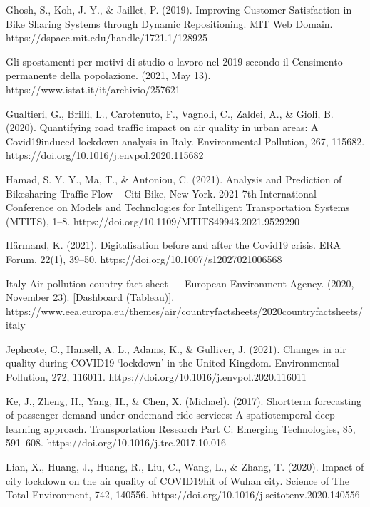 \documentclass[letterpaper,10pt,english]{jupyterBook}
\begin{document}
\sphinxAtStartPar
Ghosh, S., Koh, J. Y., \& Jaillet, P. (2019). Improving Customer Satisfaction in Bike Sharing Systems through Dynamic Repositioning. MIT Web Domain. https://dspace.mit.edu/handle/1721.1/128925

\sphinxAtStartPar
Gli spostamenti per motivi di studio o lavoro nel 2019 secondo il Censimento permanente della popolazione. (2021, May 13). https://www.istat.it/it/archivio/257621

\sphinxAtStartPar
Gualtieri, G., Brilli, L., Carotenuto, F., Vagnoli, C., Zaldei, A., \& Gioli, B. (2020). Quantifying road traffic impact on air quality in urban areas: A Covid19\sphinxhyphen{}induced lockdown analysis in Italy. Environmental Pollution, 267, 115682. https://doi.org/10.1016/j.envpol.2020.115682

\sphinxAtStartPar
Hamad, S. Y. Y., Ma, T., \& Antoniou, C. (2021). Analysis and Prediction of Bikesharing Traffic Flow – Citi Bike, New York. 2021 7th International Conference on Models and Technologies for Intelligent Transportation Systems (MT\sphinxhyphen{}ITS), 1–8. https://doi.org/10.1109/MT\sphinxhyphen{}ITS49943.2021.9529290

\sphinxAtStartPar
Härmand, K. (2021). Digitalisation before and after the Covid\sphinxhyphen{}19 crisis. ERA Forum, 22(1), 39–50. https://doi.org/10.1007/s12027\sphinxhyphen{}021\sphinxhyphen{}00656\sphinxhyphen{}8

\sphinxAtStartPar
Italy \sphinxhyphen{} Air pollution country fact sheet — European Environment Agency. (2020, November 23). {[}Dashboard (Tableau){]}. https://www.eea.europa.eu/themes/air/country\sphinxhyphen{}fact\sphinxhyphen{}sheets/2020\sphinxhyphen{}country\sphinxhyphen{}fact\sphinxhyphen{}sheets/italy

\sphinxAtStartPar
Jephcote, C., Hansell, A. L., Adams, K., \& Gulliver, J. (2021). Changes in air quality during COVID\sphinxhyphen{}19 ‘lockdown’ in the United Kingdom. Environmental Pollution, 272, 116011. https://doi.org/10.1016/j.envpol.2020.116011

\sphinxAtStartPar
Ke, J., Zheng, H., Yang, H., \& Chen, X. (Michael). (2017). Short\sphinxhyphen{}term forecasting of passenger demand under on\sphinxhyphen{}demand ride services: A spatio\sphinxhyphen{}temporal deep learning approach. Transportation Research Part C: Emerging Technologies, 85, 591–608. https://doi.org/10.1016/j.trc.2017.10.016

\sphinxAtStartPar
Lian, X., Huang, J., Huang, R., Liu, C., Wang, L., \& Zhang, T. (2020). Impact of city lockdown on the air quality of COVID\sphinxhyphen{}19\sphinxhyphen{}hit of Wuhan city. Science of The Total Environment, 742, 140556. https://doi.org/10.1016/j.scitotenv.2020.140556
\end{document}

